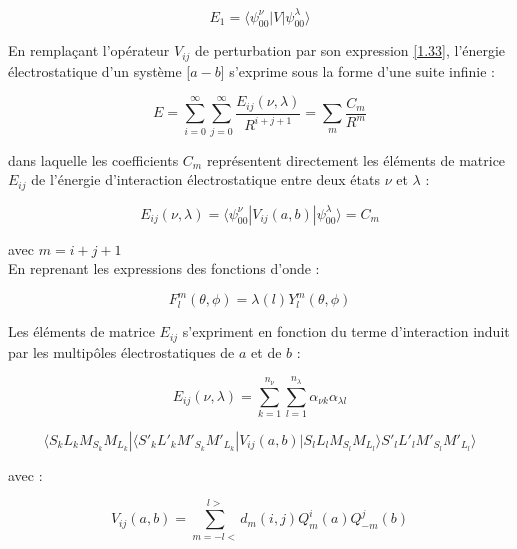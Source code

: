 \documentclass[12pt,a4paper]{book}
\begin{document}
	\begin{equation}
	E_{1} = \langle \psi_{00}^{\nu}|V| \psi_{00}^{\lambda}\rangle
	\end{equation}
	
	
	En remplaçant l'opérateur $V_{ij}$ de perturbation par son expression \ref{1.33}, l'énergie électrostatique d'un système [$a-b$] s'exprime sous la forme d'une suite infinie : 
	
	\begin{equation}
	E = \sum_{i=0}^{\infty} \sum_{j=0}^{\infty} \frac{E_{ij} (\nu,\lambda)}{R^{i+j+1}} = \sum_{m} \frac{C_{m}}{R^{m}}
	\end{equation}
	
	\noindent dans laquelle les coefficients $C_{m}$ représentent directement les éléments de matrice $E_{ij}$ de l'énergie d'interaction électrostatique entre deux états $\nu$ et $\lambda$ : 
	
	\begin{equation}
	E_{ij}(\nu, \lambda) = \langle \psi_{00}^{\nu}|V_{ij}(a,b)|\psi_{00}^{\lambda} \rangle = C_{m}
	\end{equation}
	
	\noindent avec $m= i+j+1$ \\
	En reprenant les expressions des fonctions d'onde :
	
	\begin{equation}
	F_{l}^{m} (\theta,\phi) = \lambda (l)Y_{l}^{m} (\theta,\phi)
	\end{equation}
	
	Les éléments de matrice $E_{ij}$ s'expriment en fonction du terme d'interaction induit par les multipôles électrostatiques de $a$ et de $b$ : 
	
	\begin{equation*}
	E_{ij} (\nu , \lambda) = \sum_{k=1}^{n_{\nu}} \sum_{l=1}^{n_{\lambda}} \alpha_{\nu k} \alpha_{\lambda l}
	\end{equation*}
	
	\begin{equation}
	\langle S_{k}L_{k}M_{S_{k}}M_{L_{k}}|\langle S'_{k}L'_{k}M'_{S_{k}}M'_{L_{k}}| V_{ij}(a,b)| S_{l}L_{l}M_{S_{l}} M_{L_{l}} \rangle S'_{l}L'_{l}M'_{S_{l}}M'_{L_{l}} \rangle
	\end{equation}
	
	\noindent avec : 
	
	\begin{equation}
	V_{ij}(a,b) = \sum_{m=-l<}^{l>} d_{m}(i,j) Q_{m}^{i}(a) Q_{-m}^{j}(b) 
	\end{equation}
	
\end{document}
